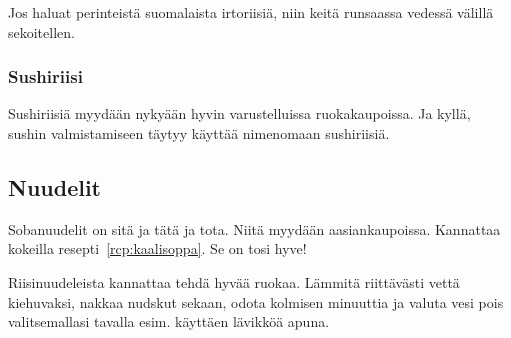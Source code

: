 \documentclass[../keittiokirja.tex]{subfiles}
\begin{document}
Jos haluat perinteistä suomalaista irtoriisiä, niin keitä runsaassa vedessä välillä sekoitellen.

\subsubsection{Sushiriisi}

Sushiriisiä myydään nykyään hyvin varustelluissa ruokakaupoissa. Ja kyllä, sushin valmistamiseen 
täytyy käyttää nimenomaan sushiriisiä. 


\subsection{Nuudelit}

Sobanuudelit on sitä ja tätä ja tota. Niitä myydään aasiankaupoissa. 
Kannattaa kokeilla resepti~\ref{rcp:kaalisoppa}. Se on tosi hyve!

Riisinuudeleista kannattaa tehdä hyvää ruokaa. Lämmitä riittävästi vettä kiehuvaksi, nakkaa nudskut 
sekaan, odota kolmisen minuuttia ja valuta vesi pois valitsemallasi tavalla esim. käyttäen lävikköä 
apuna.
\end{document}
